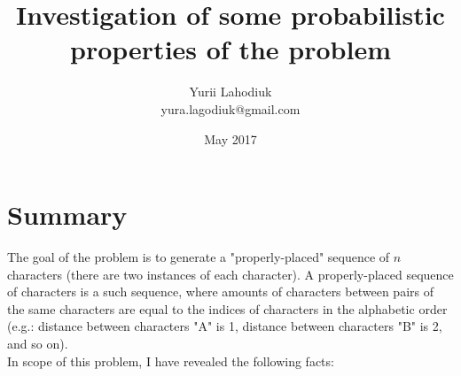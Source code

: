 \documentclass{article}
\begin{document}
\title{Investigation of some probabilistic properties of the problem}
\author{Yurii Lahodiuk \\ yura.lagodiuk@gmail.com}
\date{May 2017}
\maketitle

\tableofcontents

\clearpage

\section{Summary}

The goal of the problem is to generate a "properly-placed" sequence of $n$ characters (there are two instances of each character). A properly-placed sequence of characters is a such sequence, where amounts of characters between pairs of the same characters are equal to the indices of characters in the alphabetic order (e.g.: distance between characters "A" is 1, distance between characters "B" is 2, and so on). \\

In scope of this problem, I have revealed the following facts:
\end{document}
